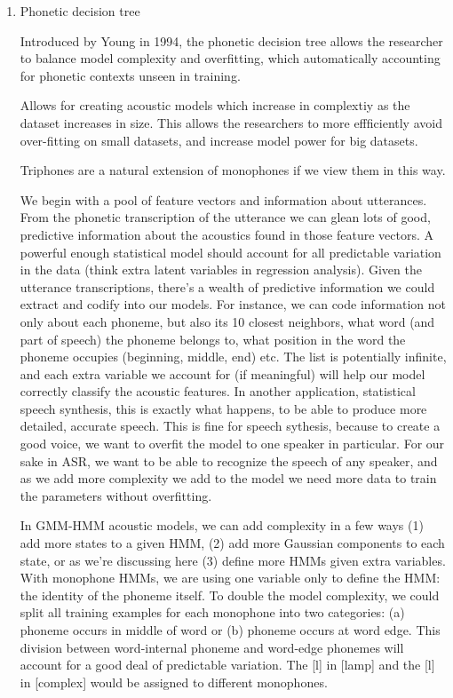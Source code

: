 \documentclass[10pt,a4paper]{article}
\begin{document}
  \begin{enumerate}
  \item Phonetic decision tree
      
    Introduced by Young in 1994, the phonetic decision tree allows the researcher to balance model complexity and overfitting, which automatically accounting for phonetic contexts unseen in training.
      
    Allows for creating acoustic models which increase in complextiy as the dataset increases in size. This allows the researchers to more effficiently avoid over-fitting on small datasets, and increase model power for big datasets.
    
    Triphones are a natural extension of monophones if we view them in this way.
    
    We begin with a pool of feature vectors and information about utterances. From the phonetic transcription of the utterance we can glean lots of good, predictive information about the acoustics found in those feature vectors. A powerful enough statistical model should account for all predictable variation in the data (think extra latent variables in regression analysis). Given the utterance transcriptions, there's a wealth of predictive information we could extract and codify into our models. For instance, we can code information not only about each phoneme, but also its 10 closest neighbors, what word (and part of speech) the phoneme belongs to, what position in the word the phoneme occupies (beginning, middle, end) etc. The list is potentially infinite, and each extra variable we account for (if meaningful) will help our model correctly classify the acoustic features. In another application, statistical speech synthesis, this is exactly what happens, to be able to produce more detailed, accurate speech. This is fine for speech sythesis, because to create a good voice, we want to overfit the model to one speaker in particular. For our sake in ASR, we want to be able to recognize the speech of any speaker, and as we add more complexity we add to the model we need more data to train the parameters without overfitting.

    In GMM-HMM acoustic models, we can add complexity in a few ways (1) add more states to a given HMM, (2) add more Gaussian components to each state, or as we're discussing here (3) define more HMMs given extra variables. With monophone HMMs, we are using one variable only to define the HMM: the identity of the phoneme itself. To double the model complexity, we could split all training examples for each monophone into two categories: (a) phoneme occurs in middle of word or (b) phoneme occurs at word edge. This division between word-internal phoneme and word-edge phonemes will account for a good deal of predictable variation. The [l] in [lamp] and the [l] in [complex] would be assigned to different monophones.


\end{enumerate}
\end{document}
